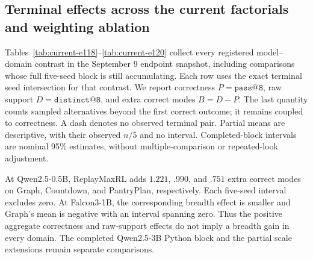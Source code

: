 \subsection{Terminal effects across the current factorials and weighting ablation}
\label{app:current-campaign-results}

Tables~\ref{tab:current-e118}--\ref{tab:current-e120} collect every registered
model--domain contrast in the September 9 endpoint snapshot, including
comparisons whose full five-seed block is still accumulating. Each row uses
the exact terminal seed intersection for that contrast. We report correctness
$P=\texttt{pass@8}$, raw support $D=\texttt{distinct@8}$, and extra correct
modes $B=D-P$. The last quantity counts sampled alternatives beyond the first
correct outcome; it remains coupled to correctness. A dash denotes no observed
terminal pair. Partial means are descriptive, with their observed $n/5$ and
no interval. Completed-block intervals are nominal 95\% estimates, without
multiple-comparison or repeated-look adjustment.

\begin{table}[H]
  \centering
  \caption{\textbf{ReplayMaxRL effects across model scales at pass 8.}
  All effects are ReplayMaxRL minus MaxRL on the displayed paired seeds.
  Brackets give paired Student-$t$ intervals for $\Delta B$ in complete blocks.
  The machine-readable report also retains both arm means, all per-seed
  effects, and intervals for $P$ and $D$.}
  \label{tab:current-e118}
  \scriptsize
  \setlength{\tabcolsep}{3pt}
\end{table}

At Qwen2.5-0.5B, ReplayMaxRL adds $1.221$, $.990$, and $.751$ extra
correct modes on Graph, Countdown, and PantryPlan, respectively. Each
five-seed interval excludes zero. At Falcon3-1B, the corresponding breadth
effect is smaller and Graph's mean is negative with an interval spanning
zero. Thus the positive aggregate correctness and raw-support effects do
not imply a breadth gain in every domain. The completed Qwen2.5-3B Python
block and the partial scale extensions remain separate comparisons.

